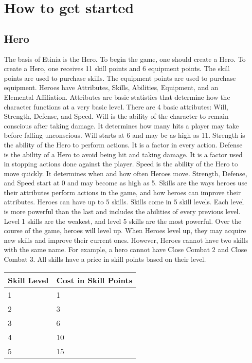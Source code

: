 \section{How to get started}

\subsection{Hero}
The basis of Etinia is the Hero.  To begin the game, one should
create a Hero.  To create a Hero, one receives 11 skill points and 6 equipment
points.  The skill points are used to purchase skills.  The equipment points
are used to purchase equipment.  Heroes have Attributes, Skills, Abilities,
Equipment, and an Elemental Affiliation.  Attributes are basic statistics that
determine how the character functions at a very basic level.  There are 4 basic
attributes: Will, Strength, Defense, and Speed.  Will is the ability of the
character to remain conscious after taking damage.  It determines how many hits
a player may take before falling unconscious.  Will starts at 6 and may be as
high as 11.  Strength is the ability of the Hero to perform actions.  It is a
factor in every action.  Defense is the ability of a Hero to avoid being hit
and taking damage.  It is a factor used in stopping actions done against the
player.  Speed is the ability of the Hero to move quickly.  It determines when
and how often Heroes move.  Strength, Defense, and Speed start at 0 and may
become as high as 5.  Skills are the ways heroes use their attributes perform
actions in the game, and how heroes can improve their attributes.  Heroes can
have up to 5 skills.  Skills come in 5 skill levels.  Each level is more
powerful than the last and includes the abilities of every previous level.
Level 1 skills are the weakest, and level 5 skills are the most powerful.
Over the course of the game, heroes will level up.  When Heroes level up, they
may acquire new skills and improve their current ones.  However, Heroes cannot
have two skills with the same name.  For example, a hero cannot have Close
Combat 2 and Close Combat 3.  All skills have a price in skill points based on
their level.  


\begin{center}
\begin{tabularx}{\textwidth}{X X}
\hline
Skill Level & Cost in Skill Points \\ \hline
1 & 1 \\
2 & 3 \\
3 & 6 \\
4 & 10 \\
5 & 15 \\
\hline
\end{tabularx}
\end{center}

